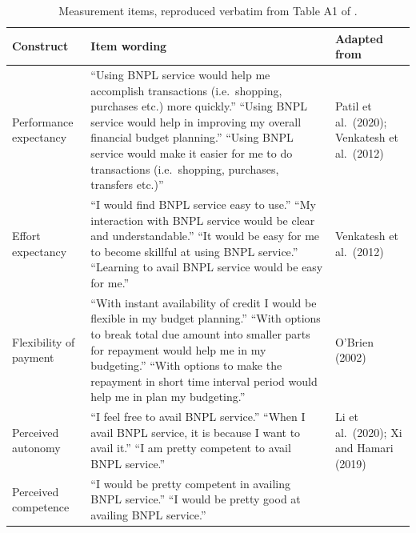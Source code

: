 \documentclass[11pt]{article}
\begin{document}
\begin{table}[H]
  \centering
  \caption{Measurement items, reproduced verbatim from Table A1 of
           \citet{dadra2024tep}.}
  \label{tab:items}
  \footnotesize
  \begin{tabular}{p{2.7cm} p{9.3cm} p{2.8cm}}
    \toprule
    Construct & Item wording & Adapted from \\
    \midrule
    Performance expectancy &
      ``Using BNPL service would help me accomplish transactions (i.e.\ shopping, purchases etc.) more quickly.'' \newline
      ``Using BNPL service would help in improving my overall financial budget planning.'' \newline
      ``Using BNPL service would make it easier for me to do transactions (i.e.\ shopping, purchases, transfers etc.)'' &
      Patil et al.\ (2020); Venkatesh et al.\ (2012) \\
    \midrule
    Effort expectancy &
      ``I would find BNPL service easy to use.'' \newline
      ``My interaction with BNPL service would be clear and understandable.'' \newline
      ``It would be easy for me to become skillful at using BNPL service.'' \newline
      ``Learning to avail BNPL service would be easy for me.'' &
      Venkatesh et al.\ (2012) \\
    \midrule
    Flexibility of payment &
      ``With instant availability of credit I would be flexible in my budget planning.'' \newline
      ``With options to break total due amount into smaller parts for repayment would help me in my budgeting.'' \newline
      ``With options to make the repayment in short time interval period would help me in plan my budgeting.'' &
      O'Brien (2002) \\
    \midrule
    Perceived autonomy &
      ``I feel free to avail BNPL service.'' \newline
      ``When I avail BNPL service, it is because I want to avail it.'' \newline
      ``I am pretty competent to avail BNPL service.'' &
      Li et al.\ (2020); Xi and Hamari (2019) \\
    \midrule
    Perceived competence &
      ``I would be pretty competent in availing BNPL service.'' \newline
      ``I would be pretty good at availing BNPL service.'' \newline

\end{tabular}
\end{table}
\end{document}
